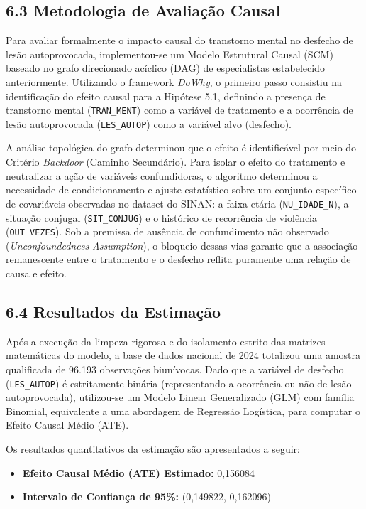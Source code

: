\subsection{6.3 Metodologia de Avaliação Causal}

Para avaliar formalmente o impacto causal do transtorno mental no desfecho de lesão autoprovocada, implementou-se um Modelo Estrutural Causal (SCM) baseado no grafo direcionado acíclico (DAG) de especialistas estabelecido anteriormente. Utilizando o framework \textit{DoWhy}, o primeiro passo consistiu na identificação do efeito causal para a Hipótese 5.1, definindo a presença de transtorno mental (\texttt{TRAN\_MENT}) como a variável de tratamento e a ocorrência de lesão autoprovocada (\texttt{LES\_AUTOP}) como a variável alvo (desfecho).

A análise topológica do grafo determinou que o efeito é identificável por meio do Critério \textit{Backdoor} (Caminho Secundário). Para isolar o efeito do tratamento e neutralizar a ação de variáveis confundidoras, o algoritmo determinou a necessidade de condicionamento e ajuste estatístico sobre um conjunto específico de covariáveis observadas no dataset do SINAN: a faixa etária (\texttt{NU\_IDADE\_N}), a situação conjugal (\texttt{SIT\_CONJUG}) e o histórico de recorrência de violência (\texttt{OUT\_VEZES}). Sob a premissa de ausência de confundimento não observado (\textit{Unconfoundedness Assumption}), o bloqueio dessas vias garante que a associação remanescente entre o tratamento e o desfecho reflita puramente uma relação de causa e efeito.

\subsection{6.4 Resultados da Estimação}

Após a execução da limpeza rigorosa e do isolamento estrito das matrizes matemáticas do modelo, a base de dados nacional de 2024 totalizou uma amostra qualificada de 96.193 observações biunívocas. Dado que a variável de desfecho (\texttt{LES\_AUTOP}) é estritamente binária (representando a ocorrência ou não de lesão autoprovocada), utilizou-se um Modelo Linear Generalizado (GLM) com família Binomial, equivalente a uma abordagem de Regressão Logística, para computar o Efeito Causal Médio (ATE).

Os resultados quantitativos da estimação são apresentados a seguir:
\begin{itemize}
    \item \textbf{Efeito Causal Médio (ATE) Estimado:} 0,156084
    \item \textbf{Intervalo de Confiança de 95\%:} (0,149822, 0,162096)
\end{itemize}

